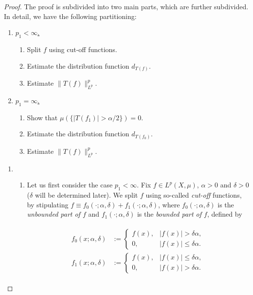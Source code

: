 \begin{proof}
	The proof is subdivided into two main parts, which are further subdivided. In detail, we have the following partitioning:

	\begin{enumerate}[label = \textbf{(\roman*.)}]
		\item \underline{$p_1 < \infty$.}
			\begin{enumerate}[label = \textbf{\alph*.}]
				\item Split $f$ using cut-off functions.
				\item Estimate the distribution function $d_{T(f)}$.
				\item Estimate $\|T(f)\|_{L^p}^p$.
			\end{enumerate}
		\item \underline{$p_1 = \infty$.}
			\begin{enumerate}[label = \textbf{\alph*.}]
				\item Show that $\mu(\{\vert T(f_1)\vert > \alpha/2\}) = 0$.
				\item Estimate the distribution function $d_{T(f_0)}$.
				\item Estimate $\|T(f)\|_{L^p}^p$.
			\end{enumerate}
	\end{enumerate}

	\begin{enumerate}[label = \textbf{(\roman*.)}]
		\item 
			\begin{enumerate}[label = \textbf{\alph*.}]
				\item Let us first consider the case \underline{$p_1 < \infty$}. Fix $f \in L^p(X,\mu)$, $\alpha > 0$ and $\delta > 0$ ($\delta$ will be determined later). We split $f$ using so-called \emph{cut-off} functions, by stipulating $f \equiv f_0(\cdot;\alpha,\delta) + f_1(\cdot;\alpha,\delta)$, where $f_0(\cdot;\alpha,\delta)$ is the \emph{unbounded part of $f$} and $f_1(\cdot;\alpha,\delta)$ is the \emph{bounded part of $f$}, defined by

	\begin{gather}
		\begin{aligned}
			f_0(x;\alpha,\delta) &:= \begin{cases}
				f(x), & \vert f(x) \vert > \delta \alpha,\\
				0, & \vert f(x)\vert \leqslant \delta \alpha.
			\end{cases}\\
			f_1(x;\alpha,\delta) &:= \begin{cases}
				f(x), & \vert f(x) \vert \leqslant \delta \alpha,\\
				0, & \vert f(x)\vert > \delta \alpha.
			\end{cases}
		\end{aligned}
		\label{eq:cut_off}
	\end{gather}


\end{enumerate}
\end{enumerate}
\end{proof}
